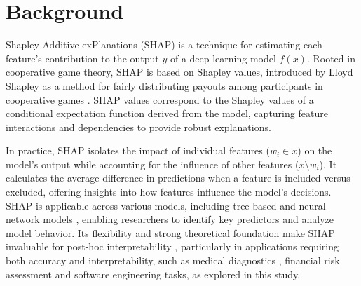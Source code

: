 \section{Background}
\label{sec:background}

Shapley Additive exPlanations (SHAP) \cite{NIPS2017_Lundberg} is a technique for estimating each feature's contribution to the output $y$ of a deep learning model $f(x)$. Rooted in cooperative game theory, SHAP is based on Shapley values, introduced by Lloyd Shapley as a method for fairly distributing payouts among participants in cooperative games \cite{shapley:book1952}. SHAP values correspond to the Shapley values of a conditional expectation function derived from the model, capturing feature interactions and dependencies to provide robust explanations.

In practice, SHAP isolates the impact of individual features ($w_i \in x$) on the model's output while accounting for the influence of other features ($x \setminus w_i$). It calculates the average difference in predictions when a feature is included versus excluded, offering insights into how features influence the model’s decisions. SHAP is applicable across various models, including tree-based \cite{kumar_shapley_problems_2020} and neural network models \cite{ahn_shapley_www_2024}, enabling researchers to identify key predictors and analyze model behavior. Its flexibility and strong theoretical foundation make SHAP invaluable for post-hoc interpretability \cite{sundararajan_many_shapley_2020}, particularly in applications requiring both accuracy and interpretability, such as medical diagnostics \cite{stiglic_health_interpretability_2020}, financial risk assessment \cite{barnes_finance_interpret} and software engineering tasks, as explored in this study.


